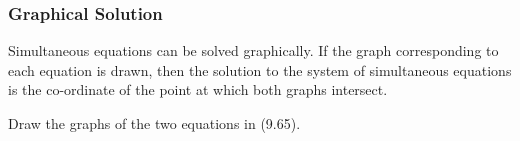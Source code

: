             \subsubsection{ Graphical Solution}
            \nopagebreak
        \label{m39257*id159067}Simultaneous equations can be solved graphically. If the graph corresponding to each equation is drawn, then the solution to the system of simultaneous equations is the co-ordinate of the point at which both graphs intersect.\par 
        \label{m39257*uid95}\nopagebreak\noindent{}
        \label{m39257*id159120}Draw the graphs of the two equations in (9.65).\par 
    \setcounter{subfigure}{0}
